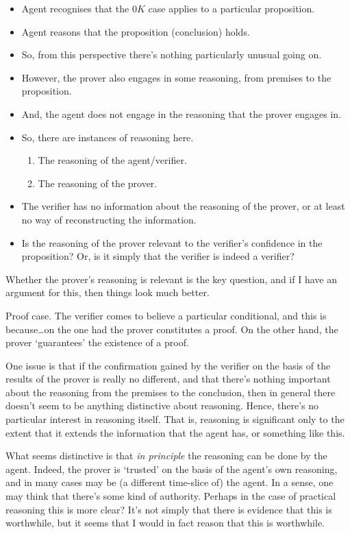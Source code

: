\documentclass[10pt]{article}
\begin{document}
\begin{itemize}
\item Agent recognises that the \(0K\) case applies to a particular proposition.
\item Agent reasons that the proposition (conclusion) holds.
\item So, from this perspective there's nothing particularly unusual going on.
\item However, the prover also engages in some reasoning, from premises to the proposition.
\item And, the agent does not engage in the reasoning that the prover engages in.
\item So, there are instances of reasoning here.
  \begin{enumerate}
  \item The reasoning of the agent/verifier.
  \item The reasoning of the prover.
  \end{enumerate}
\item The verifier has no information about the reasoning of the prover, or at least no way of reconstructing the information.
\item Is the reasoning of the prover relevant to the verifier's confidence in the proposition?
  Or, is it simply that the verifier is indeed a verifier?
\end{itemize}

Whether the prover's reasoning is relevant is the key question, and if I have an argument for this, then things look much better.

Proof case.
The verifier comes to believe a particular conditional, and this is because\dots on the one had the prover constitutes a proof.
On the other hand, the prover `guarantees' the existence of a proof.

One issue is that if the confirmation gained by the verifier on the basis of the results of the prover is really no different, and that there's nothing important about the reasoning from the premises to the conclusion, then in general there doesn't seem to be anything distinctive about reasoning.
Hence, there's no particular interest in reasoning itself.
That is, reasoning is significant only to the extent that it extends the information that the agent has, or something like this.

What seems distinctive is that \emph{in principle} the reasoning can be done by the agent.
Indeed, the prover is `trusted' on the basis of the agent's own reasoning, and in many cases may be (a different time-slice of) the agent.
In a sense, one may think that there's some kind of authority.
Perhaps in the case of practical reasoning this is more clear?
It's not simply that there is evidence that this is worthwhile, but it seems that I would in fact reason that this is worthwhile.
\end{document}
